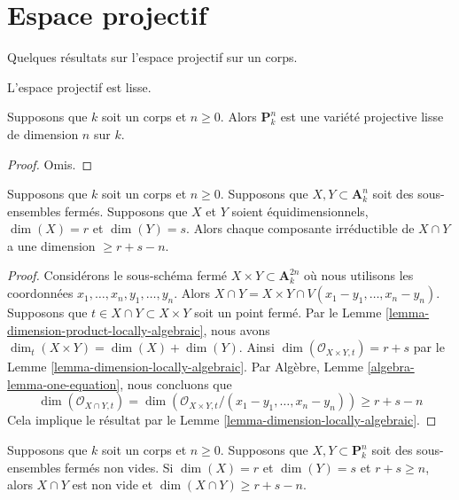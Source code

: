 \section{Espace projectif}
\label{section-projective-space}

\noindent
Quelques résultats sur l'espace projectif sur un corps.

\begin{lemma}
\label{lemma-projective-space-smooth}
\begin{slogan}
L'espace projectif est lisse.
\end{slogan}
Supposons que $k$ soit un corps et $n \geq 0$. Alors
$\mathbf{P}^n_k$ est une variété projective lisse de dimension $n$ sur $k$.
\end{lemma}

\begin{proof}
Omis.
\end{proof}

\begin{lemma}
\label{lemma-intersection-in-affine-space}
Supposons que $k$ soit un corps et $n \geq 0$. Supposons que $X, Y
\subset \mathbf{A}^n_k$ soit des sous-ensembles fermés. Supposons que $X$
et $Y$ soient équidimensionnels, $\dim(X) = r$ et $\dim(Y) = s$. Alors
chaque composante irréductible de $X \cap Y$ a une dimension $\geq r + s - n$.
\end{lemma}

\begin{proof}
Considérons le sous-schéma fermé $X \times Y \subset
\mathbf{A}^{2n}_k$ où nous utilisons les coordonnées
$x_1, \ldots, x_n, y_1, \ldots, y_n$. Alors $X \cap Y = X
\times Y \cap V(x_1 - y_1, \ldots, x_n - y_n)$. Supposons
que $t \in X \cap Y \subset X \times Y$ soit un point
fermé. Par le Lemme
\ref{lemma-dimension-product-locally-algebraic}, nous avons $\dim_t(X
\times Y) = \dim(X) + \dim(Y)$. Ainsi $\dim(\mathcal{O}_{X \times Y,
t}) = r + s$ par le Lemme \ref{lemma-dimension-locally-algebraic}.
Par Algèbre, Lemme \ref{algebra-lemma-one-equation}, nous concluons que
$$
\dim(\mathcal{O}_{X \cap Y, t}) =
\dim(\mathcal{O}_{X \times Y, t}/(x_1 - y_1, \ldots, x_n - y_n)) \geq
r + s - n
$$
Cela implique le résultat par le Lemme \ref{lemma-dimension-locally-algebraic}.
\end{proof}

\begin{lemma}
\label{lemma-intersection-in-projective-space}
Supposons que $k$ soit un corps et $n \geq 0$. Supposons que
$X, Y \subset \mathbf{P}^n_k$ soit des sous-ensembles fermés
non vides. Si $\dim(X) = r$ et $\dim(Y) = s$ et $r + s \geq n$,
alors $X \cap Y$ est non vide et $\dim(X \cap Y) \geq r + s - n$.
\end{lemma}


